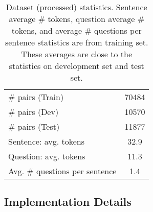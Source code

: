 \documentclass[11pt,a4paper]{article}
\begin{document}
\begin{table}[t]
\centering

    \begin{tabular}{lc} 
    \toprule
    \# pairs (Train) & 70484\\
    \# pairs (Dev) & 10570\\
     \# pairs (Test) & 11877\\ \cmidrule(r{2pt}){1-2}
     Sentence: avg. tokens & 32.9\\
     Question: avg. tokens & 11.3\\\cmidrule(r{2pt}){1-2}
     Avg. \# questions per sentence& 1.4\\
    \bottomrule
  
    \end{tabular}
  \caption{Dataset (processed) statistics. Sentence average \# tokens, question average \# tokens, and average \# questions per sentence statistics are from training set. These averages are close to the statistics on development set and test set.}
\label{tab:data}
\vspace{-0.2cm}
\end{table}



\subsection{Implementation Details}
\end{document}
